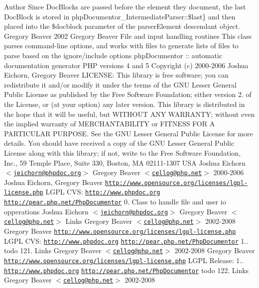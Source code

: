\begin{DoxyAuthor}{\-Author}
\-Since \-Doc\-Blocks are passed before the element they document, the last \-Doc\-Block is stored in  php\-Documentor\-\_\-\-Intermediate\-Parser\-::\$last\} and then placed into the \$docblock parameter of the parser\-Element descendant object.  \-Gregory \-Beaver    2002 \-Gregory \-Beaver  \-File and input handling routines  \-This class parses command-\/line options, and works with files to generate lists of files to parse based on the ignore/include options  php\-Documentor \-:\-: automatic documentation generator  \-P\-H\-P versions 4 and 5  \-Copyright (c) 2000-\/2006 \-Joshua \-Eichorn, \-Gregory \-Beaver  \-L\-I\-C\-E\-N\-S\-E\-:  \-This library is free software; you can redistribute it and/or modify it under the terms of the \-G\-N\-U \-Lesser \-General \-Public \-License as published by the \-Free \-Software \-Foundation; either version 2. of the \-License, or (at your option) any later version.  \-This library is distributed in the hope that it will be useful, but \-W\-I\-T\-H\-O\-U\-T \-A\-N\-Y \-W\-A\-R\-R\-A\-N\-T\-Y; without even the implied warranty of \-M\-E\-R\-C\-H\-A\-N\-T\-A\-B\-I\-L\-I\-T\-Y or \-F\-I\-T\-N\-E\-S\-S \-F\-O\-R \-A \-P\-A\-R\-T\-I\-C\-U\-L\-A\-R \-P\-U\-R\-P\-O\-S\-E. \-See the \-G\-N\-U \-Lesser \-General \-Public \-License for more details.  \-You should have received a copy of the \-G\-N\-U \-Lesser \-General \-Public \-License along with this library; if not, write to the \-Free \-Software \-Foundation, \-Inc., 59 \-Temple \-Place, \-Suite 330, \-Boston, \-M\-A 02111-\/1307 \-U\-S\-A   \-Joshua \-Eichorn $<$\href{mailto:jeichorn@phpdoc.org}{\tt jeichorn@phpdoc.\-org}$>$  \-Gregory \-Beaver $<$\href{mailto:cellog@php.net}{\tt cellog@php.\-net}$>$  2000-\/2006 \-Joshua \-Eichorn, \-Gregory \-Beaver  \href{http://www.opensource.org/licenses/lgpl-license.php}{\tt http\-://www.\-opensource.\-org/licenses/lgpl-\/license.\-php} \-L\-G\-P\-L  \-C\-V\-S\-:    \href{http://www.phpdoc.org}{\tt http\-://www.\-phpdoc.\-org}  \href{http://pear.php.net/PhpDocumentor}{\tt http\-://pear.\-php.\-net/\-Php\-Documentor}  0.  \-Class to handle file and user io opperations   \-Joshua \-Eichorn $<$\href{mailto:jeichorn@phpdoc.org}{\tt jeichorn@phpdoc.\-org}$>$  \-Gregory \-Beaver $<$\href{mailto:cellog@php.net}{\tt cellog@php.\-net}$>$     \-Links  \-Gregory \-Beaver $<$\href{mailto:cellog@php.net}{\tt cellog@php.\-net}$>$  2002-\/2008 \-Gregory \-Beaver  \href{http://www.opensource.org/licenses/lgpl-license.php}{\tt http\-://www.\-opensource.\-org/licenses/lgpl-\/license.\-php} \-L\-G\-P\-L  \-C\-V\-S\-:    \href{http://www.phpdoc.org}{\tt http\-://www.\-phpdoc.\-org}  \href{http://pear.php.net/PhpDocumentor}{\tt http\-://pear.\-php.\-net/\-Php\-Documentor}  1..  todo 121.   \-Links  \-Gregory \-Beaver $<$\href{mailto:cellog@php.net}{\tt cellog@php.\-net}$>$  2002-\/2008 \-Gregory \-Beaver  \href{http://www.opensource.org/licenses/lgpl-license.php}{\tt http\-://www.\-opensource.\-org/licenses/lgpl-\/license.\-php} \-L\-G\-P\-L  \-Release\-: 1..  \href{http://www.phpdoc.org}{\tt http\-://www.\-phpdoc.\-org}  \href{http://pear.php.net/PhpDocumentor}{\tt http\-://pear.\-php.\-net/\-Php\-Documentor}  todo 122.   \-Links  \-Gregory \-Beaver $<$\href{mailto:cellog@php.net}{\tt cellog@php.\-net}$>$  2002-\/2008 
\end{DoxyAuthor}
